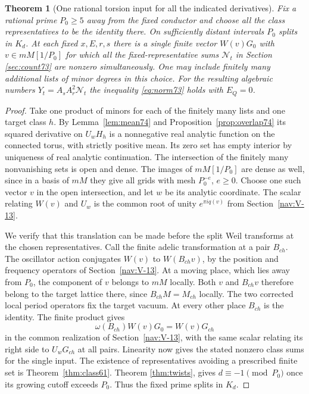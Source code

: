 \documentclass[a4paper,11pt]{article}
\newtheorem{theorem}[proposition]{Theorem}
\theoremstyle{definition}
\theoremstyle{remark}
\numberwithin{equation}{section}
\begin{document}
\begin{theorem}[One rational torsion input for all the indicated derivatives]\label{thm:nonzero74}
Fix a rational prime \(P_0\ge5\) away from the fixed conductor
and choose all the class representatives to be the identity
there. On sufficiently distant intervals \(P_0\) splits in
\(K_d\). At each fixed \(x,E,r,s\) there is a single finite
vector \(W(v)G_0\) with \(v\in mM[1/P_0]\) for which all the
fixed-representative sums \(\mathcal N_t\) in Section
\ref{sec:count73} are nonzero simultaneously. One may include
finitely many additional lists of minor degrees in this choice.
For the resulting algebraic numbers \(Y_t=A_sA_r^2\mathcal N_t\)
the inequality \eqref{eq:norm73} holds with \(E_Q=0\).
\end{theorem}
\begin{proof}
Take one product of minors for each of the finitely many lists
and one target class \(h\). By Lemma~\ref{lem:mean74} and
Proposition~\ref{prop:overlap74} its squared derivative on
\(U_wH_h\) is a nonnegative real analytic function on the
connected torus, with strictly positive mean. Its zero set has
empty interior by uniqueness of real analytic continuation.
The intersection of the finitely many nonvanishing sets is
open and dense. The images of \(mM[1/P_0]\) are dense as
well, since in a basis of \(mM\) they give all grids with mesh
\(P_0^{-e}\), \(e\ge0\). Choose one such vector \(v\) in the
open intersection, and let \(w\) be its analytic coordinate.
The scalar relating \(W(v)\) and \(U_w\) is the common root
of unity \(e^{\pi i q(v)}\) from Section~\ref{nav:V-13}.

We verify that this translation can be made before the split
Weil transforms at the chosen representatives. Call the finite
adelic transformation at a pair \(B_{ch}\). The oscillator
action conjugates \(W(v)\) to \(W(B_{ch}v)\), by the position
and frequency operators of Section~\ref{nav:V-13}. At a moving place,
which lies away from \(P_0\), the component of \(v\) belongs
to \(mM\) locally. Both \(v\) and \(B_{ch}v\) therefore belong to
the target lattice there, since
\(B_{ch}M=M_{ch}\) locally. The two corrected local period
operators fix the target vacuum. At every other place
\(B_{ch}\) is the identity. The finite product gives
\[
              \omega(B_{ch})W(v)G_0=W(v)G_{ch}
\]
in the common realization of Section~\ref{nav:V-13}, with the same scalar
relating its right side to \(U_wG_{ch}\) at all pairs.
Linearity now gives the stated nonzero class sums for the
single input. The existence of representatives avoiding a
prescribed finite set is Theorem~\ref{thm:class61}.
Theorem \ref{thm:twists}, gives \(d\equiv-1\pmod{P_0}\) once its growing cutoff exceeds \(P_0\). Thus the fixed prime splits in \(K_d\).


\end{proof}
\end{document}
